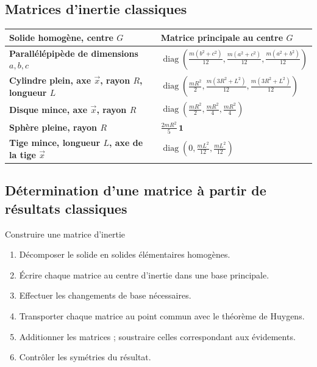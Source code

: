 \subsection{Matrices d'inertie classiques}

\begin{center}
\small
\begin{tabularx}{\linewidth}{>{\bfseries}l X}
\toprule
Solide homogène, centre $G$ & Matrice principale au centre $G$ \\
\midrule
Parallélépipède de dimensions $a,b,c$ &
$\displaystyle\operatorname{diag}\!\left(\frac{m(b^2+c^2)}{12},\frac{m(a^2+c^2)}{12},\frac{m(a^2+b^2)}{12}\right)$ \\
Cylindre plein, axe $\vec x$, rayon $R$, longueur $L$ &
$\displaystyle\operatorname{diag}\!\left(\frac{mR^2}{2},\frac{m(3R^2+L^2)}{12},\frac{m(3R^2+L^2)}{12}\right)$ \\
Disque mince, axe $\vec x$, rayon $R$ &
$\displaystyle\operatorname{diag}\!\left(\frac{mR^2}{2},\frac{mR^2}{4},\frac{mR^2}{4}\right)$ \\
Sphère pleine, rayon $R$ &
$\displaystyle\frac{2mR^2}{5}\,\mathbf 1$ \\
Tige mince, longueur $L$, axe de la tige $\vec x$ &
$\displaystyle\operatorname{diag}\!\left(0,\frac{mL^2}{12},\frac{mL^2}{12}\right)$ \\
\bottomrule
\end{tabularx}
\end{center}

\subsection{Détermination d'une matrice à partir de résultats classiques}

\begin{TLMethod}{Construire une matrice d'inertie}
\begin{enumerate}
  \item Décomposer le solide en solides élémentaires homogènes.
  \item Écrire chaque matrice au centre d'inertie dans une base principale.
  \item Effectuer les changements de base nécessaires.
  \item Transporter chaque matrice au point commun avec le théorème de Huygens.
  \item Additionner les matrices ; soustraire celles correspondant aux évidements.
  \item Contrôler les symétries du résultat.
\end{enumerate}
\end{TLMethod}

